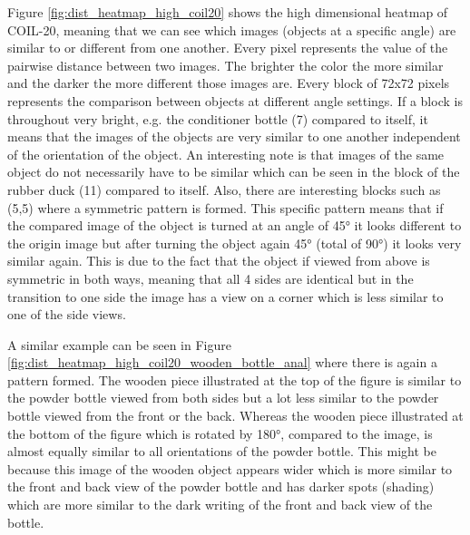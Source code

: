 Figure \ref{fig:dist_heatmap_high_coil20} shows the high dimensional heatmap of COIL-20, meaning that we can see which images (objects at a specific angle) are similar to or different from one another. Every pixel represents the value of the pairwise distance between two images. The brighter the color the more similar and the darker the more different those images are. Every block of 72x72 pixels represents the comparison between objects at different angle settings. If a block is throughout very bright, e.g. the conditioner bottle (7) compared to itself, it means that the images of the objects are very similar to one another independent of the orientation of the object. An interesting note is that images of the same object do not necessarily have to be similar which can be seen in the block of the rubber duck (11) compared to itself. Also, there are interesting blocks such as (5,5) where a symmetric pattern is formed. This specific pattern means that if the compared image of the object is turned at an angle of 45° it looks different to the origin image but after turning the object again 45° (total of 90°) it looks very similar again. This is due to the fact that the object if viewed from above is symmetric in both ways, meaning that all 4 sides are identical but in the transition to one side the image has a view on a corner which is less similar to one of the side views. 

A similar example can be seen in Figure \ref{fig:dist_heatmap_high_coil20_wooden_bottle_anal} where there is again a pattern formed. The wooden piece illustrated at the top of the figure is similar to the powder bottle viewed from both sides but a lot less similar to the powder bottle viewed from the front or the back. Whereas the wooden piece illustrated at the bottom of the figure which is rotated by 180°, compared to the image, is almost equally similar to all orientations of the powder bottle. This might be because this image of the wooden object appears wider which is more similar to the front and back view of the powder bottle and has darker spots (shading) which are more similar to the dark writing of the front and back view of the bottle.

